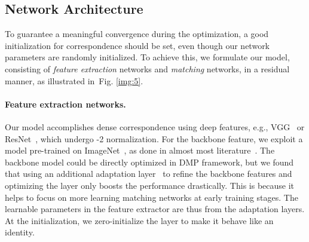 \documentclass[10pt,twocolumn,letterpaper]{article}
\newcommand{\figref}[1]{Fig. \ref{#1}}
\begin{document}
\subsection{Network Architecture}\label{sec:3_4}
To guarantee a meaningful convergence during the optimization, a good initialization for correspondence  should be set, even though our network parameters  are randomly initialized. 
To achieve this, we formulate our model, consisting of \emph{feature extraction} networks and \emph{matching} networks, in a residual manner, as illustrated in~\figref{img:5}. \vspace{-10pt}

\paragraph{Feature extraction networks.}
Our model accomplishes dense correspondence using deep features, e.g., VGG~\cite{simonyan2014very} or ResNet~\cite{he2016deep}, which undergo -2 normalization. For the backbone feature, we exploit a model pre-trained on ImageNet~\cite{deng2009imagenet}, as done in almost most literature~\cite{rocco2018neighbourhood,kim2019semantic,melekhov2019dgc,kim2019semantic,truong2020glu,shen2020ransac}. The backbone model could be directly optimized in DMP framework, but we found that using an additional adaptation layer~\cite{lee2019sfnet} to refine the backbone features and optimizing the layer only boosts the performance drastically. This is because it helps to focus on more learning matching networks at early training stages. The learnable parameters  in the feature extractor are thus from the adaptation layers. At the initialization, we zero-initialize the layer to make it behave like an identity.
\vspace{-10pt}
\begin{figure*}[t]
	\centering
	\renewcommand{\thesubfigure}{}
	\\
	\vspace{-10pt}
	\caption{\textbf{Network configuration and loss function of DMP:} Our networks consist of feature extraction and matching networks, which are formulated in a residual manner to guarantee a good initialization for optimization. Note that a single-level version of the networks are illustrated for brevity, while the full model is formulated in a pyramidal fashion. A confidence-aware contrastive loss enables joint learning of feature extraction and matching networks by rejecting ambiguous matches while accepting confident matches through a thresholding.}\vspace{-10pt}\label{img:5}
\end{figure*}
\end{document}
